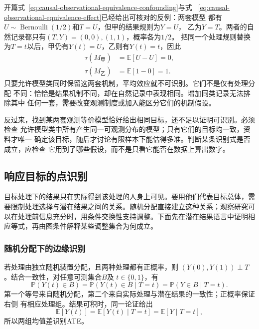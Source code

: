 开篇式~\eqref{eq:causal-observational-equivalence-confounding}与式
~\eqref{eq:causal-observational-equivalence-effect}已经给出可核对的反例：两套模型
都有\(U\sim\operatorname{Bernoulli}(1/2)\)和\(T=U\)，但甲的结果规则为\(Y=U\)，
乙为\(Y=T\)。两者的自然记录都只有\((T,Y)=(0,0),(1,1)\)，概率各为\(1/2\)。
把同一个处理规则替换为\(T=t\)以后，甲仍有\(Y(t)=U\)，乙则有\(Y(t)=t\)，因此
\[
  \begin{aligned}
    \tau(M_{\text{甲}})&=\mathbb E[U-U]=0,\\
    \tau(M_{\text{乙}})&=\mathbb E[1-0]=1.
  \end{aligned}
\]
只要允许模型类同时保留这两套机制，平均效应就不可识别。它们不是仅有处理分配
不同：恰恰是结果机制不同，却在自然记录中表现相同。增加同类记录无法排除其中
任何一套，需要改变观测制度或加入能区分它们的机制假设。

反过来，找到某两套观测等价模型恰好给出相同目标，还不足以证明可识别。必须检查
允许模型类中所有产生同一可观测分布的模型；只有它们的目标均一致，资料才唯一
确定该目标，随后才讨论有限样本下能估得多准。判断某条识别式是否成立，应检查
它用到了哪些假设，而不是只看它能否在数据上算出数字。

\subsection{响应目标的点识别}
\label{sec:causal-point-identification}

目标处理下的结果只在实际得到该处理的人身上可见。要用他们代表目标总体，需要限制处理选择与潜在结果之间的关系。随机分配直接建立这种关系；观察研究可以在处理前信息充分时，用条件交换性支持调整。下面先在潜在结果语言中证明相应等式，再由图条件解释某些调整集合为何成立。

\subsubsection{随机分配下的边缘识别}
\label{sec:causal-randomized-identification}

若处理由独立随机装置分配，且两种处理都有正概率，则
\((Y(0),Y(1))\perp T\)。结合一致性，对任意可测集合\(B\)及
\(t\in\{0,1\}\)，有
\begin{equation}
  \mathbb P(Y(t)\in B)
  =
  \mathbb P(Y(t)\in B\mid T=t)
  =
  \mathbb P(Y\in B\mid T=t).
  \label{eq:causal-randomization-marginal-distribution}
\end{equation}
第一个等号来自随机分配，第二个来自实际处理与潜在结果的一致性；正概率保证右侧
有相应处理组。结果可积时，同一论证给出
\[
  \mathbb E[Y(t)]
  =\mathbb E[Y(t)\mid T=t]
  =\mathbb E[Y\mid T=t],
\]
所以两组均值差识别ATE。

